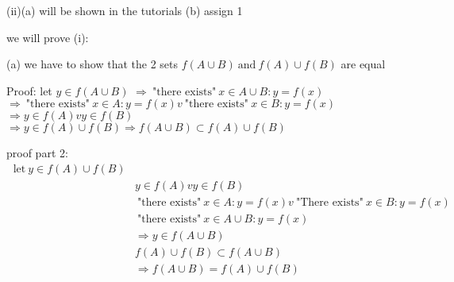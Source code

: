 \documentclass{article}
\begin{document}
(ii)(a) will be shown in the tutorials
(b) assign 1

we will prove (i):

(a) we have to show that the 2 sets $f(A \cup B) \ \text{and} \ f(A) \cup f(B)$ are equal

Proof:
let $y \in f(A \cup B)$ 
$\Rightarrow \ \text{"there exists"} \ x \in A \cup B: y = f(x)$
$\Rightarrow \ \text{"there exists"} \ x \in A: y = f(x) v \ \text{"there exists"} \ x \in B: y = f(x)$
$\Rightarrow y \in f(A) v y \in f(B)$ 
$\Rightarrow y \in f(A) \cup f(B) \Rightarrow f(A \cup B) \subset f(A) \cup f(B)$


proof part 2:
 \begin{align*}
   \ \text{let} \ y \in f(A) \cup f(B) \\
   & y \in f(A) v y \in f(B) \\
   & \ \text{"there exists"} \ x \in A: y = f(x) v \ \text{"There exists"} \ x \in B: y = f(x) \\
   & \ \text{"there exists"} \ x \in A \cup B: y = f(x) \\
   & \Rightarrow y \in f(A \cup B) \\
   & f(A) \cup f(B) \subset f(A \cup B) \\
   & \Rightarrow f(A \cup B) = f(A) \cup f(B)
\end{align*} 
\end{document}

